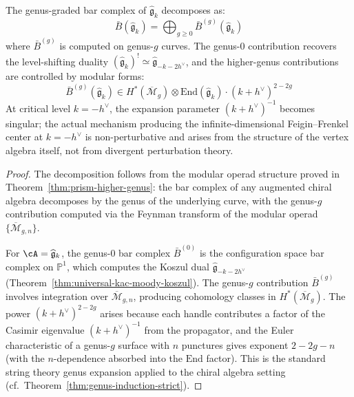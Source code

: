\begin{theorem}\label{thm:km-higher-genus-corrections}
The genus-graded bar complex of $\widehat{\mathfrak{g}}_k$ decomposes as:
\begin{equation}
\bar{B}(\widehat{\mathfrak{g}}_k) = \bigoplus_{g \geq 0} \bar{B}^{(g)}(\widehat{\mathfrak{g}}_k)
\end{equation}
where $\bar{B}^{(g)}$ is computed on genus-$g$ curves.  The genus-$0$ contribution recovers the level-shifting duality $(\widehat{\mathfrak{g}}_k)^! \simeq \widehat{\mathfrak{g}}_{-k-2h^\vee}$, and the higher-genus contributions are controlled by modular forms:
\begin{equation}
\bar{B}^{(g)}(\widehat{\mathfrak{g}}_k) \in H^*(\overline{\mathcal{M}}_g) \otimes \mathrm{End}(\widehat{\mathfrak{g}}_k) \cdot (k+h^\vee)^{2-2g}
\end{equation}
At critical level $k = -h^\vee$, the expansion parameter $(k+h^\vee)^{-1}$ becomes singular; the actual mechanism producing the infinite-dimensional Feigin--Frenkel center at $k = -h^\vee$ is non-perturbative and arises from the structure of the vertex algebra itself, not from divergent perturbation theory.
\end{theorem}

\begin{proof}
The decomposition follows from the modular operad structure proved in Theorem~\ref{thm:prism-higher-genus}: the bar complex of any augmented chiral algebra decomposes by the genus of the underlying curve, with the genus-$g$ contribution computed via the Feynman transform of the modular operad $\{\overline{\mathcal{M}}_{g,n}\}$.

For $\cA = \widehat{\mathfrak{g}}_k$, the genus-0 bar complex $\bar{B}^{(0)}$ is the configuration space bar complex on $\mathbb{P}^1$, which computes the Koszul dual $\widehat{\mathfrak{g}}_{-k-2h^\vee}$ (Theorem~\ref{thm:universal-kac-moody-koszul}).  The genus-$g$ contribution $\bar{B}^{(g)}$ involves integration over $\overline{\mathcal{M}}_{g,n}$, producing cohomology classes in $H^*(\overline{\mathcal{M}}_g)$.  The power $(k+h^\vee)^{2-2g}$ arises because each handle contributes a factor of the Casimir eigenvalue $(k+h^\vee)^{-1}$ from the propagator, and the Euler characteristic of a genus-$g$ surface with $n$ punctures gives exponent $2-2g-n$ (with the $n$-dependence absorbed into the $\mathrm{End}$ factor).  This is the standard string theory genus expansion applied to the chiral algebra setting (cf.\ Theorem~\ref{thm:genus-induction-strict}).
\end{proof}

